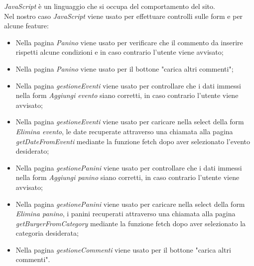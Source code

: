 \emph{JavaScript} è un linguaggio che si occupa del comportamento del sito.\\
Nel nostro caso \emph{JavaScript} viene usato per effettuare controlli sulle form e per alcune feature:
\begin{itemize}
    \item Nella pagina \emph{Panino} viene usato per verificare che il commento da inserire rispetti alcune condizioni e in caso contrario l'utente viene avvisato;
    \item Nella pagina \emph{Panino} viene usato per il bottone "carica altri commenti";
    \item Nella pagina \emph{gestioneEventi} viene usato per controllare che i dati immessi nella form \emph{Aggiungi evento} siano corretti, in caso contrario l'utente viene avvisato;
    \item Nella pagina \emph{gestioneEventi} viene usato per caricare nella select della form \emph{Elimina evento}, le date recuperate attraverso una chiamata alla pagina \emph{getDateFromEventi} mediante la funzione fetch dopo aver selezionato l'evento desiderato;
    \item Nella pagina \emph{gestionePanini} viene usato per controllare che i dati immessi nella form \emph{Aggiungi panino} siano corretti, in caso contrario l'utente viene avvisato;
    \item Nella pagina \emph{gestionePanini} viene usato per caricare nella select della form \emph{Elimina panino}, i panini recuperati attraverso una chiamata alla pagina \emph{getBurgerFromCategory} mediante la funzione fetch dopo aver selezionato la categoria desiderata;
    \item Nella pagina \emph{gestioneCommenti} viene usato per il bottone "carica altri commenti".
\end{itemize}